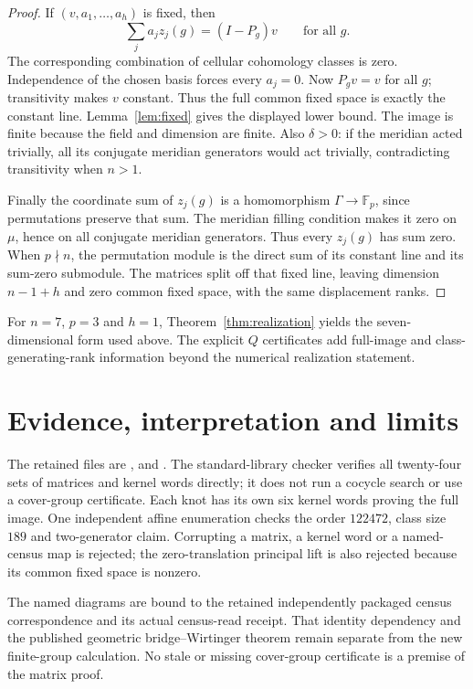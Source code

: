 \documentclass[11pt]{article}
\newcommand{\F}{\mathbb F}
\begin{document}
\begin{proof}
If $(v,a_1,\ldots,a_h)$ is fixed, then
\[
                    \sum_j a_jz_j(g)=(I-P_g)v
                    \qquad\text{for all }g.
\]
The corresponding combination of cellular cohomology classes is
zero. Independence of the chosen basis forces every $a_j=0$.
Now $P_gv=v$ for all $g$; transitivity makes $v$ constant.
Thus the full common fixed space is exactly the constant line.
Lemma~\ref{lem:fixed} gives the displayed lower bound.
The image is finite because the field and dimension are finite.
Also $\delta>0$: if the meridian acted trivially, all its conjugate
meridian generators would act trivially, contradicting transitivity
when $n>1$.

Finally the coordinate sum of $z_j(g)$ is a homomorphism
$\Gamma\to\F_p$, since permutations preserve that sum.
The meridian filling condition makes it zero on $\mu$, hence on
all conjugate meridian generators. Thus every $z_j(g)$ has sum zero.
When $p\nmid n$, the permutation module is the direct sum of its
constant line and its sum-zero submodule. The matrices split off
that fixed line, leaving dimension $n-1+h$ and zero common fixed
space, with the same displacement ranks.
\end{proof}

For $n=7$, $p=3$ and $h=1$, Theorem~\ref{thm:realization} yields
the seven-dimensional form used above. The explicit $Q$ certificates
add full-image and class-generating-rank information beyond the
numerical realization statement.

\section{Evidence, interpretation and limits}

The retained files are
,
 and
.
The standard-library checker verifies all twenty-four sets of
matrices and kernel words directly; it does not run a cocycle search
or use a cover-group certificate. Each knot has its own six kernel
words proving the full image. One independent affine enumeration
checks the order $122472$, class size $189$ and two-generator claim.
Corrupting a matrix, a kernel word or a named-census map is rejected;
the zero-translation principal lift is also rejected because its
common fixed space is nonzero.

The named diagrams are bound to the retained independently packaged
census correspondence and its actual census-read receipt.
That identity dependency and the published geometric
bridge--Wirtinger theorem remain separate from the new finite-group
calculation. No stale or missing cover-group certificate is a
premise of the matrix proof.
\end{document}

